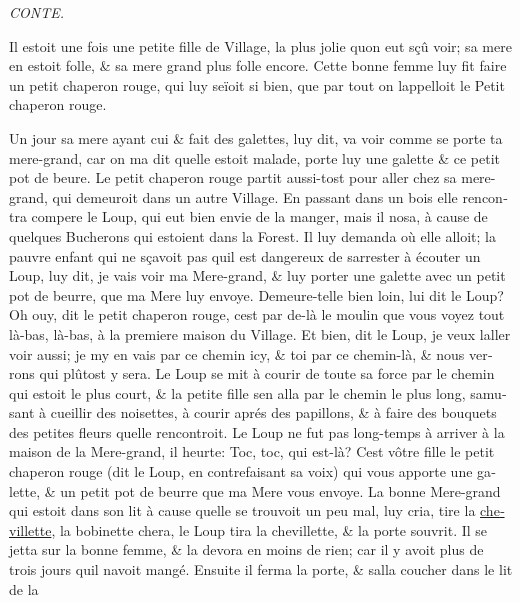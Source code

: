 \documentclass[14pt,a4paper]{memoir}
\newcommand{\ul}[1]{\uline{#1}}
\begin{document}
\begin{otherlanguage}{french}
\emph{CONTE.}

Il estoit une fois une petite fille de Village, la plus jolie
qu\textquotesingle on eut sçû voir; sa mere en estoit folle, \& sa mere
grand plus folle encore. Cette bonne femme luy fit faire un petit
chaperon rouge, qui luy seïoit si bien, que par tout on
l\textquotesingle appelloit le Petit chaperon rouge.

Un jour sa mere ayant cui \& fait des galettes, luy dit, va voir comme
se porte ta mere-grand, car on m\textquotesingle a dit
qu\textquotesingle elle estoit malade, porte luy une galette \& ce petit
pot de beure. Le petit chaperon rouge partit aussi-tost pour aller chez
sa mere-grand, qui demeuroit dans un autre Village. En passant dans un
bois elle rencontra compere le Loup, qui eut bien envie de la manger,
mais il n\textquotesingle osa, à cause de quelques Bucherons qui
estoient dans la Forest. Il luy demanda où elle alloit; la pauvre enfant
qui ne sçavoit pas qu\textquotesingle il est dangereux de
s\textquotesingle arrester à écouter un Loup, luy dit, je vais voir ma
Mere-grand, \& luy porter une galette avec un petit pot de beurre, que
ma Mere luy envoye. Demeure-t\textquotesingle elle bien loin, lui dit le
Loup? Oh ouy, dit le petit chaperon rouge, c\textquotesingle est par
de-là le moulin que vous voyez tout là-bas, là-bas, à la premiere maison
du Village. Et bien, dit le Loup, je veux l\textquotesingle aller voir
aussi; je m\textquotesingle y en vais par ce chemin icy, \& toi par ce
chemin-là, \& nous verrons qui plûtost y sera. Le Loup se mit à courir
de toute sa force par le chemin qui estoit le plus court, \& la petite
fille s\textquotesingle en alla par le chemin le plus long,
s\textquotesingle amusant à cueillir des noisettes, à courir aprés des
papillons, \& à faire des bouquets des petites fleurs
qu\textquotesingle elle rencontroit. Le Loup ne fut pas long-temps à
arriver à la maison de la Mere-grand, il heurte: Toc, toc, qui est-là?
C\textquotesingle est vôtre fille le petit chaperon rouge (dit le Loup,
en contrefaisant sa voix) qui vous apporte une galette, \& un petit pot
de beurre que ma Mere vous envoye. La bonne Mere-grand qui estoit dans
son lit à cause qu\textquotesingle elle se trouvoit un peu mal, luy
cria, tire la \ul{chevillette}, la bobinette chera, le Loup tira la
chevillette, \& la porte s\textquotesingle ouvrit. Il se jetta sur la
bonne femme, \& la devora en moins de rien; car il y avoit plus de trois
jours qu\textquotesingle il n\textquotesingle avoit mangé. Ensuite il
ferma la porte, \& s\textquotesingle alla coucher dans le lit de la

\end{otherlanguage}
\end{document}

